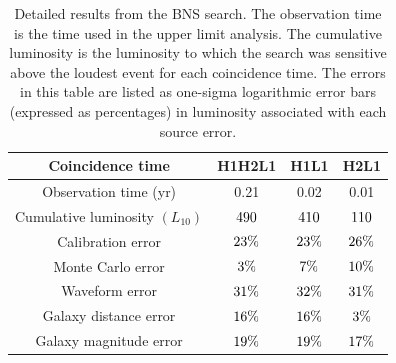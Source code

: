 %
\begin{table}[t]
\center
\begin{tabular}{c | c | c | c}
\hline \hline
\multicolumn{1}{m{5cm}|}{\centering Coincidence time} & H1H2L1 & H1L1 & H2L1 \\
\hline
\multicolumn{1}{m{5cm}|}{\centering Observation time (yr)} & 0.21 & 0.02 & 0.01 \\
\hline
\multicolumn{1}{m{5cm}|}{\centering Cumulative luminosity $\left({L_{10}}\right)$} & $490$ & $410$ & $110$ \\
\hline
\multicolumn{1}{m{5cm}|}{\centering Calibration error} & $23\%$ & $23\%$ & $26\%$ \\
\hline
\multicolumn{1}{m{5cm}|}{\centering Monte Carlo error} & $3\%$ & $7\%$ & $10\%$ \\
\hline
\multicolumn{1}{m{5cm}|}{\centering Waveform error} & $31\%$ & $32\%$ & $31\%$ \\
\hline
\multicolumn{1}{m{5cm}|}{\centering Galaxy distance error} & $16\%$ & $16\%$ & $3\%$ \\
\hline
\multicolumn{1}{m{5cm}|}{\centering Galaxy magnitude error} & $19\%$ & $19\%$ & $17\%$ \\
\hline
\hline
\end{tabular}
\caption{Detailed results from the BNS search.  The observation
time is the time used in the upper limit analysis.  The cumulative
luminosity is the luminosity to which the search was sensitive above the
loudest event for each coincidence time.  The errors in this table are
listed as one-sigma logarithmic error bars (expressed as percentages) in
luminosity associated with each source error.}
\label{tab:bns}
\end{table}


